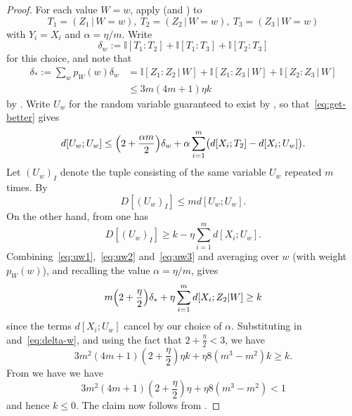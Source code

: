 \documentclass[10pt,a4paper]{article}
\newcommand{\uses}[1]{}
\newcommand{\leanok}{}
\newcommand{\bbI}{\mathbb{I}}
\begin{document}
\begin{proof}\uses{lem:get-better, multidist-ruzsa-III, multidist-lower, xi-z2-w-dist, eta-def-multi, multidist-nonneg, Zero-sum, prop:52}\leanok For each value $W=w$, apply  (and ) to
  \[
    T_1 = (Z_1 \,|\, W \mathop{=} w),\
    T_2 = (Z_2 \,|\, W \mathop{=} w),\
    T_3 = (Z_3 \,|\, W \mathop{=} w)
  \]
  with $Y_i=X_i$ and $\alpha=\eta/m$.  Write
  \[
    \delta_w :=  \bbI[T_1 : T_2] + \bbI[T_1 : T_3] + \bbI[T_2 : T_3]
  \]
  for this choice, and note that
  \begin{align}
    \label{eq:delta-w}
    \nonumber
    \delta_\ast := \sum_w p_W(w) \delta_w &= \bbI[Z_1 : Z_2 \,|\, W] + \bbI[Z_1 : Z_3 \,|\, W] + \bbI[Z_2 : Z_3 \,|\, W] \\
                           & \leq 3 m (4m+1) \eta k
  \end{align}
  by \Cref{prop:52}.
  Write $U_w$ for the random variable guaranteed to exist by ,
  so that~\eqref{eq:get-better} gives \begin{equation}
    \label{eq:uw1}
    d[U_w; U_w] \leq \Bigl( 2 + \frac{\alpha m}{2} \Bigr) \delta_w + \alpha \sum_{i=1}^m \bigl( d[X_i; T_2] - d[X_i; U_w] \bigr).
  \end{equation}
  Let $(U_w)_I$ denote the tuple consisting of the same variable $U_w$ repeated $m$ times.
  By 
  \begin{equation}
    \label{eq:uw2}
    D[(U_w)_I] \leq m d[U_w; U_w].
  \end{equation}
  On the other hand, from  one has
  \begin{equation}
    \label{eq:uw3}
    D[(U_w)_I] \geq k - \eta \sum_{i=1}^m d[X_i;U_w].
  \end{equation}
  Combining~\eqref{eq:uw1},~\eqref{eq:uw2} and~\eqref{eq:uw3} and averaging over $w$ (with weight $p_W(w)$), and recalling the value $\alpha=\eta/m$, gives
  \[
     m \Bigl( 2 + \frac{\eta}{2} \Bigr) \delta_\ast + \eta \sum_{i=1}^m d[X_i; Z_2 | W]
    \geq k
  \]
  since the terms $d[X_i; U_w]$ cancel by our choice of $\alpha$.
  Substituting in  and~\eqref{eq:delta-w}, and using the fact that $2 + \frac{\eta}{2} < 3$, we have
  \[
    3 m^2 (4m+1) (2+\frac{\eta}{2}) \eta k + \eta 8(m^3-m^2) k \geq k.
  \]
  From \Cref{eta-def-multi} we have we have
  $$ 3 m^2 (4m+1) (2+\frac{\eta}{2}) \eta + \eta 8(m^3-m^2) < 1$$
  and hence $k \leq 0$.  The claim now follows from .
\end{proof}
\end{document}
